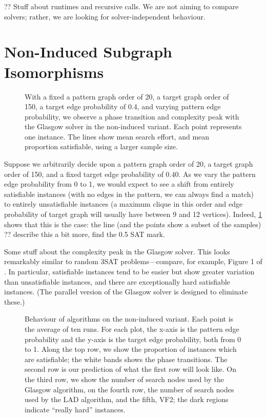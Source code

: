 \documentclass[letterpaper]{article}
\begin{document}
?? Stuff about runtimes and recursive calls. We are not aiming to compare solvers; rather, we are
looking for solver-independent behaviour.

\section{Non-Induced Subgraph Isomorphisms}

\begin{figure}[t]
    
    \caption{With a fixed a pattern graph order of 20, a target graph order of 150, a target edge
        probability of 0.4, and varying pattern edge probability, we observe a phase transition and
        complexity peak with the Glasgow solver in the non-induced variant. Each point represents
        one instance. The lines show mean search effort, and mean proportion satisfiable, using a
    larger sample size.}
    \label{figure:phase-transition}
\end{figure}

Suppose we arbitrarily decide upon a pattern graph order of 20, a target graph order of 150, and a
fixed target edge probability of 0.40. As we vary the pattern edge probability from 0 to 1, we would
expect to see a shift from entirely satisfiable instances (with no edges in the pattern, we can
always find a match) to entirely unsatisfiable instances (a maximum clique in this order and edge
probability of target graph will usually have between 9 and 12 vertices). Indeed,
\cref{figure:phase-transition} shows that this is the case: the line (and the points show a subset
of the samples) ?? describe this a bit more, find the 0.5 SAT mark.

Some stuff about the complexity peak in the Glasgow solver. This looks remarkably similar to random
3SAT problems---compare, for example, Figure 1 of \citet{LeytonBrown:2014}. In particular,
satisfiable instances tend to be easier but show greater variation than unsatisfiable instances, and
there are exceptionally hard satisfiable instances. (The parallel version of the Glasgow solver is
designed to eliminate these.)

\begin{figure}[tb]
    
    \caption{Behaviour of algorithms on the non-induced variant. Each point is the average of ten
        runs. For each plot, the x-axis is the pattern edge probability and the y-axis is the target
        edge probability, both from 0 to 1. Along the top row, we show the proportion of instances which are
        satisfiable; the white bands shows the phase transitions. The second row is our prediction
        of what the first row will look like. On the third row, we show the number of search nodes
        used by the Glasgow algorithm, on the fourth row, the number of search nodes used by the LAD
        algorithm, and the fifth, VF2; the dark regions indicate ``really hard'' instances.}
    \label{figure:non-induced}
\end{figure}
\end{document}
